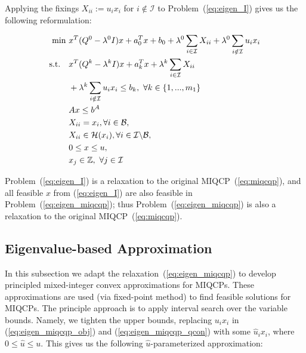 \documentclass[]{article}
\begin{document}
Applying the fixings $X_{ii} := u_ix_i$ for $i\notin\mathcal{I}$ to Problem~(\ref{eq:eigen_I}) gives us the following reformulation:

\begin{subequations}\label{eq:eigen_miqcqp}
    \begin{align}
        \min\ &x^T(Q^0 - \lambda^0 I)x + a_0^Tx + b_0 + \lambda^0\sum_{i\in\mathcal{I}} X_{ii} + \lambda^0\sum_{i\notin\mathcal{I}} u_ix_i \label{eq:eigen_miqcqp_obj} \\
        \mbox{s.t.}\quad &x^T(Q^k - \lambda^k I)x + a_k^Tx + \lambda^k\sum_{i\in\mathcal{I}} X_{ii}\notag\\ 
        &+ \lambda^k\sum_{i\notin\mathcal{I}} u_ix_i \leq b_k,\ \forall k\in\{1,...,m_1\}\label{eq:eigen_miqcqp_qcon}\\
        &Ax \leq b^A\\
        &X_{ii} = x_i, \forall i\in\mathcal{B},\\
        &X_{ii} \in \mathcal{H}(x_i), \forall i\in\mathcal{I}\backslash \mathcal{B},\\
        &0 \leq x \leq u,\\
        &x_j\in \mathbb{Z},\ \forall j\in\mathcal{I}\label{eq:eigen_miqcqp_end}
    \end{align}
\end{subequations}

Problem~(\ref{eq:eigen_I}) is a relaxation to the original MIQCP~(\ref{eq:miqcqp}), and all feasible $x$ from (\ref{eq:eigen_I}) are also feasible in Problem~(\ref{eq:eigen_miqcqp}); thus Problem~(\ref{eq:eigen_miqcqp}) is also a relaxation to the original MIQCP~(\ref{eq:miqcqp}).

\subsection{Eigenvalue-based Approximation} \label{sec:eigen_method}

In this subsection we adapt the relaxation~(\ref{eq:eigen_miqcqp}) to develop principled mixed-integer convex approximations for MIQCPs. These approximations are used (via fixed-point method) to find feasible solutions for MIQCPs. The principle approach is to apply interval search over the variable bounds. Namely, we tighten the upper bounds, replacing $u_ix_i$ in (\ref{eq:eigen_miqcqp_obj}) and (\ref{eq:eigen_miqcqp_qcon}) with some $\hat{u}_ix_i$, where $0\leq \hat{u}\leq u$. This gives us the following $\hat{u}$-parameterized approximation:
\end{document}
